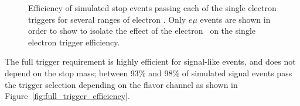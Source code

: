 \begin{figure}[ht]
  \centering
  \caption[
    Efficiency of simulated stop events passing each of the single
    electron triggers for several ranges of electron \ET.
  ]{
    Efficiency of simulated stop events passing each of the single
    electron triggers for several ranges of electron \ET.
    Only $e\mu$ events are shown in order to show to isolate the effect of
    the electron \ET\ on the single electron trigger efficiency.
  }
  \label{fig:electron_trigger_pt_dependence}
\end{figure}

The full trigger requirement is highly efficient for signal-like events,
and does not depend on the stop mass; between 93\% and 98\% of simulated
signal events pass the trigger selection depending on the flavor channel as
shown in Figure~\ref{fig:full_trigger_efficiency}.

